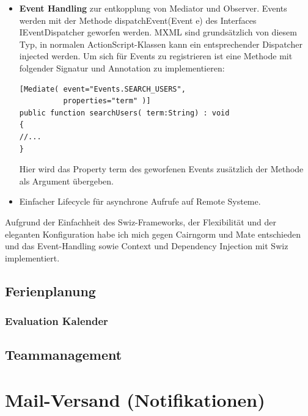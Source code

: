 \begin{itemize}
\begin{itemize}
Objekte k\"onnen nun in beliebeigen MXML-Dateien oder ActionScript Klassen injected werden - selbst two-way Bindings sind m\"oglich:
\begin{lstlisting}[caption=Swiz: Bean Injection]
[Inject(source="context.selectedTeam", 
        bind="true",
        twoWay="true")]
public var selectedTeam:Team = null;
\end{lstlisting}
\item \textbf{Event Handling} zur entkopplung von Mediator und Observer. Events werden mit der Methode dispatchEvent(Event e) des Interfaces IEventDispatcher geworfen werden. MXML sind grunds\"atzlich von diesem Typ, in normalen ActionScript-Klassen kann ein entsprechender Dispatcher injected werden. Um sich f\"ur Events zu registrieren ist eine Methode mit folgender Signatur und Annotation zu implementieren:

\begin{lstlisting}[caption=Swiz: Event Observer]
[Mediate( event="Events.SEARCH_USERS", 
          properties="term" )]
public function searchUsers( term:String) : void
{
//...
}
\end{lstlisting}
Hier wird das Property term des geworfenen Events zus\"atzlich der Methode als Argument \"ubergeben.
\item Einfacher Lifecycle f\"ur asynchrone Aufrufe auf Remote Systeme.
\end{itemize}
\end{itemize}

Aufgrund der Einfachheit des Swiz-Frameworks, der Flexibilit\"at und der eleganten Konfiguration habe ich mich gegen Cairngorm und Mate entschieden und das Event-Handling sowie Context und Dependency Injection mit Swiz implementiert.


\subsection{Ferienplanung}\label{implementation:ferienplanung}
\subsubsection{Evaluation Kalender}
\subsection{Teammanagement}\label{implementation:teammanagement}

\section{Mail-Versand (Notifikationen)}
